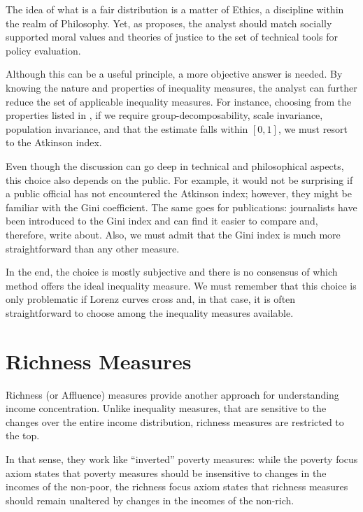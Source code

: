 \documentclass[
]{book}
\begin{document}
The idea of what is a fair distribution is a matter of Ethics, a discipline within the realm of Philosophy. Yet, as \textcite[Ch.1]{fleur1996} proposes, the analyst should match socially supported moral values and theories of justice to the set of technical tools for policy evaluation.

Although this can be a useful principle, a more objective answer is needed. By knowing the nature and properties of inequality measures, the analyst can further reduce the set of applicable inequality measures. For instance, choosing from the properties listed in \textcite[p.74]{cowell2011}, if we require group-decomposability, scale invariance, population invariance, and that the estimate falls within \([0,1]\), we must resort to the Atkinson index.

Even though the discussion can go deep in technical and philosophical aspects, this choice also depends on the public. For example, it would not be surprising if a public official has not encountered the Atkinson index; however, they might be familiar with the Gini coefficient. The same goes for publications: journalists have been introduced to the Gini index and can find it easier to compare and, therefore, write about. Also, we must admit that the Gini index is much more straightforward than any other measure.

In the end, the choice is mostly subjective and there is no consensus of which method offers the ideal inequality measure. We must remember that this choice is only problematic if Lorenz curves cross and, in that case, it is often straightforward to choose among the inequality measures available.

\hypertarget{richness-measures}{%
\chapter{Richness Measures}\label{richness-measures}}

Richness (or Affluence) measures provide another approach for understanding
income concentration. Unlike inequality measures, that are sensitive to the
changes over the entire income distribution, richness measures are restricted
to the top.

In that sense, they work like ``inverted'' poverty measures: while the poverty
focus axiom states that poverty measures should be insensitive to changes
in the incomes of the non-poor, the richness focus
axiom states that richness measures should remain unaltered by changes in the
incomes of the non-rich.
\end{document}

